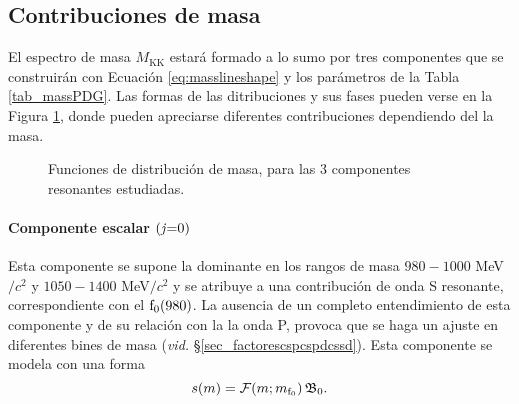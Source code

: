 \subsection{Contribuciones de masa}

El espectro de masa $M_{\text{KK}}$ estará formado a lo sumo por tres componentes que se construirán con Ecuación \ref{eq:masslineshape} y los parámetros de la Tabla \ref{tab_massPDG}. Las formas de las ditribuciones y sus fases pueden verse en la Figura \ref{fig:masslineshape}, donde pueden apreciarse diferentes contribuciones dependiendo del la masa.

\begin{figure}[H]
\centering
{} \hfill
{} \hfill
{} \hfill
{} \hfill
\caption{Funciones de distribución de masa, para las 3 componentes resonantes estudiadas.}  \label{fig:masslineshape}
\end{figure}

\paragraph{Componente escalar $\text{(\textit{j}}\text{=}\text{0)}$}
Esta componente se supone la dominante en los rangos de masa $980- 1000$ MeV$/c^2$ y $1050-1400$ MeV$/c^2$ y se atribuye a una contribución de onda S resonante, correspondiente con el $\text{f}_0(980)$. %
La ausencia de un completo entendimiento de esta componente y de su relación con la la onda P, provoca que se haga un ajuste en diferentes bines de masa (\emph{vid.} \S \ref{sec_factorescspcspdcssd}). Esta componente se modela con una forma 
\begin{equation}
	s(m) = \mathcal{F}(m;m_{\text{f}_0}) \, \mathfrak{B}_0.
\end{equation}

